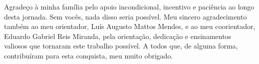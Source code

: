 \documentclass[
        oneside,      %
        english,			
        brazil			 
        ]{configcefetmglpd}
\begin{document}


\printacapa


\printacatalog  


\printafolhaaprov



 
\begin{agradecimentos}
Agradeço à minha família pelo apoio incondicional, incentivo e paciência ao longo desta jornada. Sem vocês, nada disso seria possível.
Meu sincero agradecimento também ao meu orientador, Luís Augusto Mattos Mendes, e ao meu coorientador, Eduardo Gabriel Reis Miranda, pela orientação, dedicação e ensinamentos valiosos que tornaram este trabalho possível.
A todos que, de alguma forma, contribuíram para esta conquista, meu muito obrigado.

\end{agradecimentos}


\end{document}
